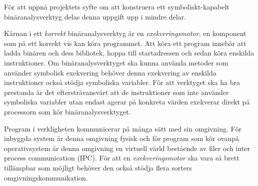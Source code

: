 

För att uppnå projektets syfte om att konstruera ett symboliskt-kapabelt
binäranalysverktyg delas denna uppgift upp i mindre delar.

Kärnan i ett \textit{korrekt} binäranalysverktyg är en
\textit{exekveringsmotor}, en komponent som på ett korrekt vis kan köra
programmet. Att köra ett program innebär att ladda binären och dess bibliotek,
hoppa till startadressen och sedan köra enskilda instruktioner. Om
binäranalysverktyget ska kunna använda metoder som använder symbolisk exekvering
behöver denna exekvering av enskilda instruktioner också stödja symboliska
variabler. För att verktyget ska ha bra prestanda är det eftersträvansvärt att
de instruktioner som inte använder symboliska variabler utan endast agerar på
konkreta värden exekverar direkt på processorn som kör binäranalysverktyget.

Program i verkligheten kommunicerar på många sätt med sin omgivning. För
inbyggda system är denna omgivning fysisk och för program som kör ovanpå
operativsystem är denna omgivning en virtuell värld bestående av filer och inter
process communication (IPC). För att en \textit{exekveringsmotor} ska vara så
brett tillämpbar som möjligt behöver den också stödja flera sorters
omgivningskommunikation.

